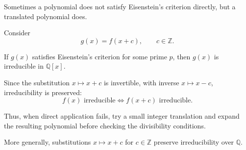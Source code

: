 \begin{method}
Sometimes a polynomial does not satisfy Eisenstein's criterion directly, but a translated polynomial does.

Consider
\[
g(x)=f(x+c),
\qquad c\in\mathbb{Z}.
\]

If \(g(x)\) satisfies Eisenstein's criterion for some prime \(p\), then \(g(x)\) is irreducible in \(\mathbb{Q}[x]\).

Since the substitution \(x\mapsto x+c\) is invertible, with inverse \(x\mapsto x-c\), irreducibility is preserved:
\[
\boxed{
f(x)\text{ irreducible}
\iff
f(x+c)\text{ irreducible}.
}
\]

Thus, when direct application fails, try a small integer translation and expand the resulting polynomial before checking the divisibility conditions.

More generally, substitutions \(x\mapsto x+c\) for \(c\in\mathbb{Z}\) preserve irreducibility over \(\mathbb{Q}\).
\end{method}
